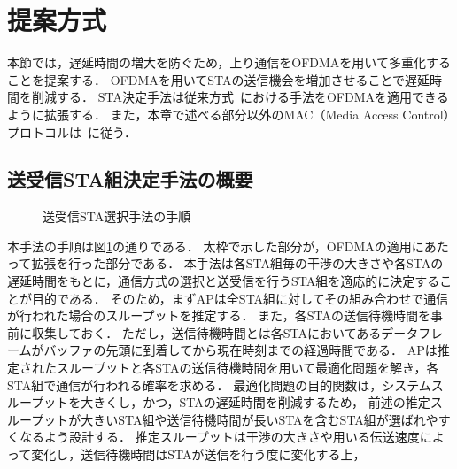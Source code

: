 \documentclass[technicalreport]{ieicej}
\newcommand{\sij}{(i,j)}
\newcommand{\sijk}{(i,j,k)}
\newcommand{\rijk}{r^{(i,j,k)}}
\def\coloneqq{\mathrel{\mathop:}=}
\begin{document}
\section{提案方式}\label{sec:propose}
	本節では，遅延時間の増大を防ぐため，上り通信をOFDMAを用いて多重化することを提案する．
	OFDMAを用いてSTAの送信機会を増加させることで遅延時間を削減する．
	STA決定手法は従来方式~\cite{promac_fair}における手法をOFDMAを適用できるように拡張する．
	また，本章で述べる部分以外のMAC（Media Access Control）プロトコルは~\cite{promac}に従う．

	\subsection{送受信STA組決定手法の概要}\label{sec:opt}
		\begin{figure}[t]
			\centering
			\caption{送受信STA選択手法の手順}
			\label{fig:process}
		\end{figure}
		本手法の手順は図\ref{fig:process}の通りである．
		太枠で示した部分が，OFDMAの適用にあたって拡張を行った部分である．
		本手法は各STA組毎の干渉の大きさや各STAの遅延時間をもとに，通信方式の選択と送受信を行うSTA組を適応的に決定することが目的である．
		そのため，まずAPは全STA組に対してその組み合わせで通信が行われた場合のスループットを推定する．
		また，各STAの送信待機時間を事前に収集しておく．
		ただし，送信待機時間とは各STAにおいてあるデータフレームがバッファの先頭に到着してから現在時刻までの経過時間である．
		APは推定されたスループットと各STAの送信待機時間を用いて最適化問題を解き，各STA組で通信が行われる確率を求める．
		最適化問題の目的関数は，システムスループットを大きくし，かつ，STAの遅延時間を削減するため，
		前述の推定スループットが大きいSTA組や送信待機時間が長いSTAを含むSTA組が選ばれやすくなるよう設計する．
		推定スループットは干渉の大きさや用いる伝送速度によって変化し，送信待機時間はSTAが送信を行う度に変化する上，
\end{document}
